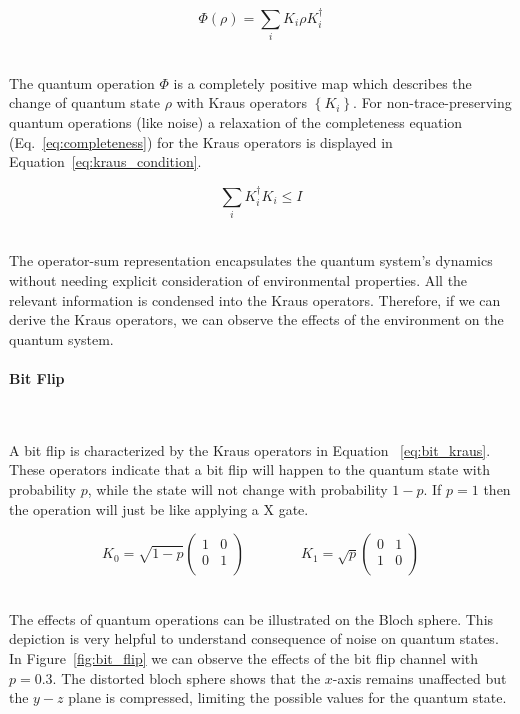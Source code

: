 \begin{equation}\label{eq:kraus_operation}
  \Phi \left(\rho\right) = \sum_{i} K_{i} \rho K_{i}^{\dag}
\end{equation} \

The quantum operation \(\Phi\) is a completely positive map which
describes the change of quantum state \(\rho\) with Kraus operators
\(\left\{K_i\right\}\). For non-trace-preserving quantum operations
(like noise) a relaxation of the completeness equation
(Eq.~\ref{eq:completeness}) for the Kraus operators is displayed
in Equation~\ref{eq:kraus_condition}. \

\begin{equation}\label{eq:kraus_condition}
  \sum_{i} K_{i}^{\dag} K_{i} \leq I
\end{equation} \

The operator-sum representation encapsulates the quantum system's
dynamics without needing explicit consideration of environmental
properties. All the relevant information is condensed into the 
Kraus operators. Therefore, if we can derive the Kraus operators, we
can observe the effects of the environment on the quantum system. \

\paragraph{Bit Flip} \

A bit flip is characterized by the Kraus operators in Equation
~\ref{eq:bit_kraus}. These operators indicate that a bit flip
will happen to the quantum state with probability \(p\), while
the state will not change with probability \(1-p\). If \(p=1\)
then the operation will just be like applying a X gate. \

\begin{equation}\label{eq:bit_kraus}
  K_0 = \sqrt{1-p} \begin{pmatrix}
          1 & 0 \\
          0 & 1 \\
        \end{pmatrix} \qquad \qquad
  K_1 = \sqrt{p} \begin{pmatrix}
          0 & 1 \\
          1 & 0 \\
        \end{pmatrix}
\end{equation} \

The effects of quantum operations can be illustrated on the Bloch sphere.
This depiction is very helpful to understand consequence of noise on
quantum states. In Figure~\ref{fig:bit_flip} we can observe the effects
of the bit flip channel with \(p=0.3\). The distorted bloch sphere shows
that the \(x\)-axis remains unaffected but the \(y-z\) plane is compressed,
limiting the possible values for the quantum state. \

